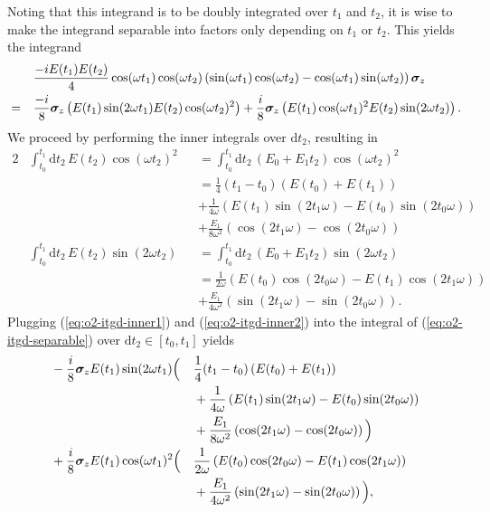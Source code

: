 Noting that this integrand is to be doubly integrated over $t_1$ and $t_2$, it is wise to make the integrand separable into factors only depending on $t_1$ or $t_2$. This yields the integrand
\begin{alignat}{2}
	& &&\frac{-iE(t_1)E(t_2)}{4} \cos(\omega t_1) \cos(\omega t_2) \left( \sin(\omega t_1)\cos(\omega t_2) - \cos(\omega t_1)\sin(\omega t_2) \right) \bm{\sigma}_z \nonumber \\
	&= &&\frac{-i}{8} \bm{\sigma}_z \left( E(t_1) \sin(2 \omega t_1) E(t_2) \cos(\omega t_2)^2 \right) + \frac{i}{8} \bm{\sigma}_z \left( E(t_1) \cos(\omega t_1)^2 E(t_2) \sin(2 \omega t_2) \right). \label{eq:o2-itgd-separable}
\end{alignat}
We proceed by performing the inner integrals over $\mathrm{d}t_2$, resulting in
\begin{alignat}{2}
	&\int_{t_0}^{t_1} \mathrm{d}t_2\, E(t_2) \cos(\omega t_2)^2 &&= \int_{t_0}^{t_1} \mathrm{d}t_2\, (E_0 + E_1 t_2) \cos(\omega t_2)^2 \nonumber \\
	& &&= \frac{1}{4}(t_1 - t_0)\left( E(t_0) + E(t_1) \right) \nonumber \\
	& &&+ \frac{1}{4\omega} \left( E(t_1) \sin(2 t_1 \omega) - E(t_0) \sin(2 t_0 \omega) \right) \nonumber  \\
	& &&+ \frac{E_1}{8 \omega^2} \left( \cos(2 t_1 \omega) - \cos(2 t_0 \omega) \right) \label{eq:o2-itgd-inner1}\\
	&\int_{t_0}^{t_1} \mathrm{d}t_2\, E(t_2) \sin(2 \omega t_2) &&= \int_{t_0}^{t_1} \mathrm{d}t_2\, (E_0 + E_1 t_2) \sin(2 \omega t_2) \nonumber \\
	& &&= \frac{1}{2 \omega} \left( E(t_0) \cos(2 t_0 \omega) - E(t_1) \cos(2 t_1 \omega) \right) \nonumber \\
	& &&+ \frac{E_1}{4 \omega^2} \left( \sin(2 t_1 \omega) - \sin(2 t_0 \omega) \right). \label{eq:o2-itgd-inner2}
\end{alignat}
Plugging (\ref{eq:o2-itgd-inner1}) and (\ref{eq:o2-itgd-inner2}) into the integral of (\ref{eq:o2-itgd-separable}) over $\mathrm{d}t_2 \in [t_0,t_1]$ yields
\begin{alignat}{2}
	&-\frac{i}{8} \bm{\sigma}_z  E(t_1) \sin(2 \omega t_1) \Big( && \frac{1}{4}(t_1 - t_0)\left( E(t_0) + E(t_1) \right) \nonumber \\
	& &&+ \frac{1}{4\omega} \left( E(t_1) \sin(2 t_1 \omega) - E(t_0) \sin(2 t_0 \omega) \right) \nonumber  \\
	& &&+ \frac{E_1}{8 \omega^2} \left( \cos(2 t_1 \omega) - \cos(2 t_0 \omega) \right) \Big)  \nonumber \\
	&+ \frac{i}{8} \bm{\sigma}_z  E(t_1) \cos(\omega t_1)^2 \Big( &&\frac{1}{2 \omega} \left( E(t_0) \cos(2 t_0 \omega) - E(t_1) \cos(2 t_1 \omega) \right) \nonumber \\
	& &&+ \frac{E_1}{4 \omega^2} \left( \sin(2 t_1 \omega) - \sin(2 t_0 \omega) \right) \Big),
\end{alignat}

